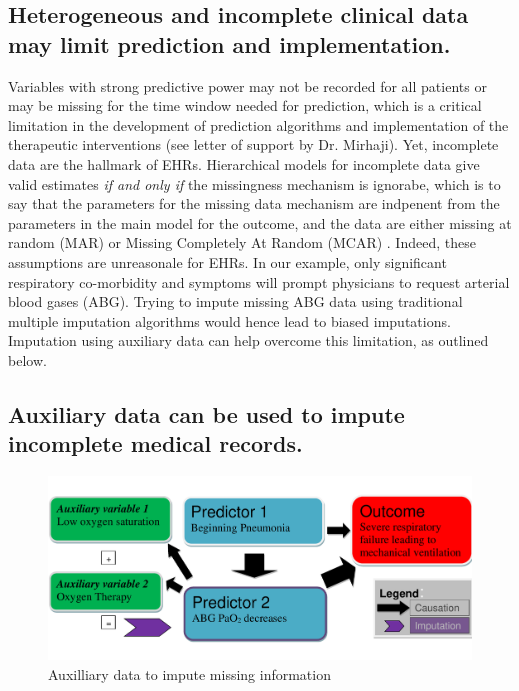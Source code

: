 \documentclass[11pt,notitlepage]{article}
\begin{document}
\subsection*{Heterogeneous and incomplete clinical data may limit prediction and implementation.}
Variables with strong predictive power may not be recorded for all patients 
or may be missing for the time window needed for prediction, which is a critical limitation 
in the development of prediction algorithms and implementation of the 
therapeutic interventions (see letter of support by Dr. Mirhaji). 
Yet, incomplete data are the hallmark of EHRs. 
Hierarchical models for incomplete data give valid estimates 
\textit{if and only if} the missingness mechanism is ignorabe, which is to say that the parameters 
for the missing data mechanism are indpenent from the parameters in the main model for the 
outcome, and the data are either missing at random (MAR) or Missing Completely At Random 
(MCAR) \cite{Rubin1976}. Indeed, these assumptions are unreasonale for EHRs. In our example, only 
significant respiratory co-morbidity and symptoms will prompt physicians to request arterial blood gases (ABG). Trying to 
impute missing ABG data using traditional multiple imputation algorithms would hence lead to biased 
imputations. Imputation using auxiliary data can help overcome this limitation, as outlined below.

\subsection*{Auxiliary data can be used to impute incomplete medical records.} 

\begin{figure} 
 \vspace{-25pt}
 \includegraphics[scale=0.4]{Figures/Bayesian_imputation.pdf}
    \vspace{-20pt}
  \caption{Auxilliary data to impute missing information}
   \vspace{-15pt}
   \label{fig:Imputation_fig}
\end{figure}
\end{document}
